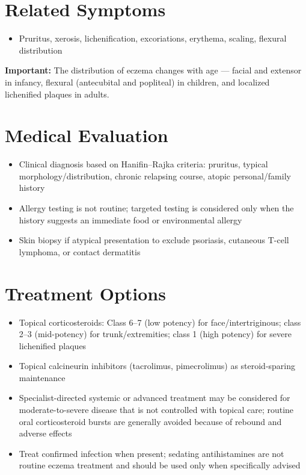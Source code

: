 \section*{Related Symptoms}
\begin{itemize}
  \item Pruritus, xerosis, lichenification, excoriations, erythema, scaling, flexural distribution
\end{itemize}
\textbf{Important:} The distribution of eczema changes with age --- facial and extensor in infancy, flexural (antecubital and popliteal) in children, and localized lichenified plaques in adults.

\section*{Medical Evaluation}
\begin{itemize}
  \item Clinical diagnosis based on Hanifin--Rajka criteria: pruritus, typical morphology/distribution, chronic relapsing course, atopic personal/family history
  \item Allergy testing is not routine; targeted testing is considered only when the history suggests an immediate food or environmental allergy
  \item Skin biopsy if atypical presentation to exclude psoriasis, cutaneous T-cell lymphoma, or contact dermatitis
\end{itemize}

\section*{Treatment Options}
\begin{itemize}
  \item Topical corticosteroids: Class 6--7 (low potency) for face/intertriginous; class 2--3 (mid-potency) for trunk/extremities; class 1 (high potency) for severe lichenified plaques
  \item Topical calcineurin inhibitors (tacrolimus, pimecrolimus) as steroid-sparing maintenance
  \item Specialist-directed systemic or advanced treatment may be considered for moderate-to-severe disease that is not controlled with topical care; routine oral corticosteroid bursts are generally avoided because of rebound and adverse effects
  \item Treat confirmed infection when present; sedating antihistamines are not routine eczema treatment and should be used only when specifically advised
\end{itemize}

